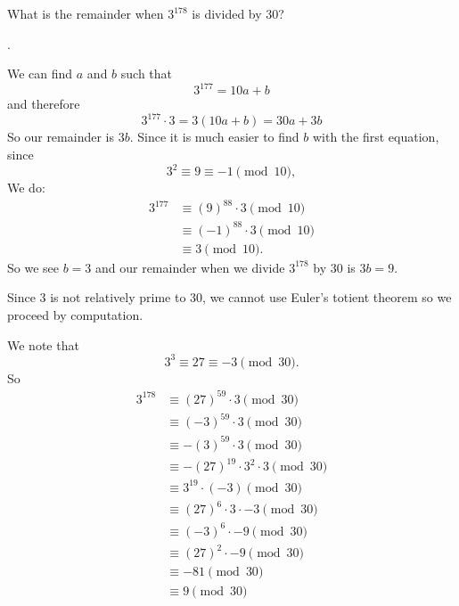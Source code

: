 \documentclass[11pt]{article}
\begin{document}
\begin{problem}What is the remainder when $3^{178}$ is divided by 30?
\end{problem}
\begin{answer}
.
\end{answer}
\begin{solutionone}
We can find $a$ and $b$ such that 
$$3^{177} = 10a+b$$
and therefore 
$$3^{177} \cdot 3 = 3(10a+b) = 30a+3b$$
So our remainder is $3b$. Since it is much easier to find $b$ with the first equation, since
$$3^2 \equiv 9 \equiv -1 \pmod{10},$$
We do:
\begin{align*}
3^{177} &\equiv (9)^{88} \cdot 3  \pmod{10} \\
&\equiv (-1)^{88} \cdot 3 \pmod{10} \\
&\equiv 3 \pmod{10}.
\end{align*}
So we see $b=3$ and our remainder when we divide $3^{178}$ by 30 is $3b = \boxed{9}$.
\end{solutionone}
\begin{solutiontwo}
Since 3 is not relatively prime to 30, we cannot use Euler’s totient theorem so we proceed by computation. \par
We note that 
$$3^3 \equiv 27 \equiv -3 \pmod{30}.$$
So 
\begin{align*}
3^{178} &\equiv (27)^{59} \cdot 3 \pmod{30} \\
&\equiv (-3)^{59} \cdot 3 \pmod{30}\\
&\equiv -(3)^{59} \cdot 3 \pmod{30}\\
&\equiv -(27)^{19} \cdot 3^2 \cdot 3 \pmod{30}\\
&\equiv 3^{19} \cdot (-3) \pmod{30}\\
&\equiv (27)^6 \cdot 3 \cdot -3  \pmod{30}\\
&\equiv (-3)^6 \cdot -9 \pmod{30}\\
&\equiv (27)^2 \cdot -9 \pmod{30}\\
&\equiv -81 \pmod{30}\\
&\equiv \boxed{9} \pmod{30}\\
\end{align*}
\end{solutiontwo}
\end{document}
